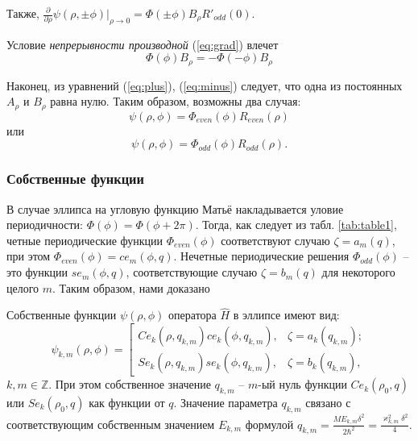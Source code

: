 Также, $\frac{\partial}{\partial \rho} \psi( \rho,\pm \phi)|_{\rho \to 0} = \Phi(\pm\phi) B_\rho R'_{odd}(0)$.

Условие \textit{непрерывности производной} (\ref{eq:grad}) влечет
\begin{equation}\label{eq:minus}
 \Phi(\phi) B_\rho = -\Phi(-\phi) B_\rho
\end{equation}

Наконец, из уравнений (\ref{eq:plus}), (\ref{eq:minus}) следует, что одна из постоянных $A_\rho$ и $B_\rho$ равна нулю.
Таким образом, возможны два случая:
\[ \psi(\rho,\phi) = \Phi_{even}(\phi) R_{even}(\rho)  \] 
или
\[ \psi(\rho,\phi) = \Phi_{odd}(\phi) R_{odd}(\rho) .  \]
\subsubsection{Собственные функции}\label{sec:ch1/sec4/sub1/sub1}
В случае эллипса на угловую функцию Матьё накладывается уловие периодичности: $\Phi(\phi) = \Phi(\phi+ 2 \pi)$. 
Тогда, как следует из табл. \ref{tab:table1}, четные периодические функции $\Phi_{even}(\phi)$ соответствуют случаю $\zeta = a_m(q)$, при этом $\Phi_{even}(\phi) = ce_m(\phi, q)$. 
Нечетные периодические решения $\Phi_{odd}(\phi)$ -- это функции 
$se_m(\phi, q)$, соответствующие случаю $\zeta = b_m(q)$ для некоторого целого $m$. Таким образом, нами доказано
    
\begin{statement}
Собственные функции $\psi(\rho, \phi)$ оператора $\hat{H}$ в эллипсе имеют вид:
\[
    \psi_{k,m}(\rho, \phi) = \left[
    \begin{array}{ccc}
    Ce_k(\rho, q_{k,m})ce_k(\phi, q_{k,m}), & \zeta = a_k(q_{k, m}); \\
    Se_k(\rho, q_{k,m})se_k(\phi, q_{k,m}), & \zeta = b_k(q_{k, m}),
    \end{array}
    \right.
\]
$k, m \in \mathbb{Z}$. При этом собственное значение  $q_{k, m}$ -- $m$-ый нуль функции $Ce_k(\rho_0, q)$ или $Se_k(\rho_0, q)$ как функции от $q$.
Значение параметра $q_{k,m}$ связано с соответствующим собственным значением $E_{k,m}$ формулой  $q_{k,m} = \frac{M E_{k,m}\delta^2}{2\hbar^2} = \frac{\varkappa_{k,m}^2\delta^2}{4}$. 
\end{statement}

